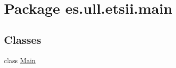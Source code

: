 \hypertarget{namespacees_1_1ull_1_1etsii_1_1main}{\section{Package es.\-ull.\-etsii.\-main}
\label{namespacees_1_1ull_1_1etsii_1_1main}
}
\subsection*{Classes}
\begin{DoxyCompactItemize}
\item 
class \hyperlink{classes_1_1ull_1_1etsii_1_1main_1_1_main}{Main}
\end{DoxyCompactItemize}
